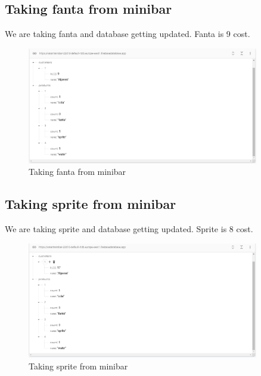 \subsection{Taking fanta from minibar}
We are taking fanta and database getting updated. Fanta is 9 cost.
\begin{figure}[!htbp]
    \centering
    \includegraphics[width=0.9\textwidth]{Imgs/taking fanta.PNG}
    \caption{\label{fig:taking products from minibar}Taking fanta from minibar}
\end{figure}

\subsection{Taking sprite from minibar}
We are taking sprite and database getting updated. Sprite is 8 cost.
\begin{figure}[!htbp]
    \centering
    \includegraphics[width=0.9\textwidth]{Imgs/taking sprite.PNG}
    \caption{\label{fig:taking products from minibar}Taking sprite from minibar}
\end{figure}

